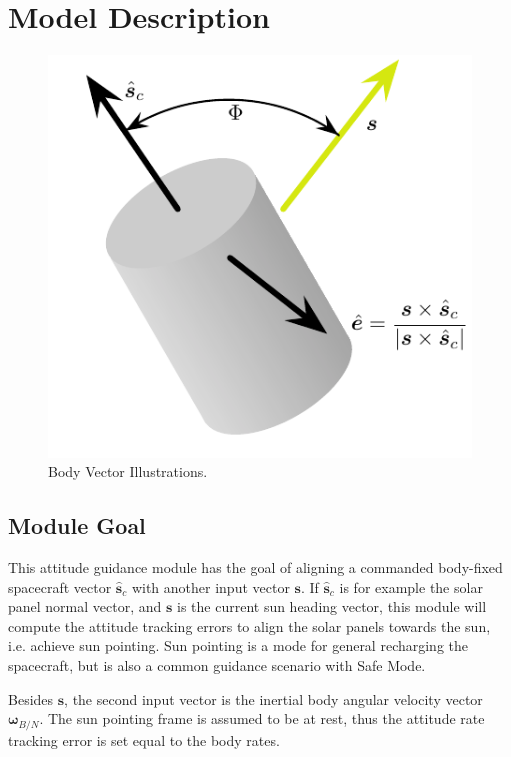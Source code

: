 
\section{Model Description}

\begin{figure}[H]
	\centerline{
		\includegraphics{Figures/sunHeading}
	}
	\caption{Body Vector Illustrations.}
	\label{fig:Fig1}
\end{figure}

\subsection{Module Goal}
This attitude guidance module has the goal of aligning a commanded body-fixed spacecraft vector $\hat{\bm s}_{c}$ with another input vector $\bm s$.  If $\hat{\bm s}_{c}$ is for example the solar panel normal vector, and $\bm s$ is the current sun heading vector, this module will compute the attitude tracking errors to align the solar panels towards the sun, i.e. achieve sun pointing.  Sun pointing is a mode for general recharging the spacecraft, but is also a common guidance scenario with Safe Mode.  

Besides $\bm s$, the second input vector is the inertial body angular velocity vector $\bm\omega_{B/N}$.  The sun pointing frame is assumed to be at rest, thus the attitude rate tracking error is set equal to the body rates.  

